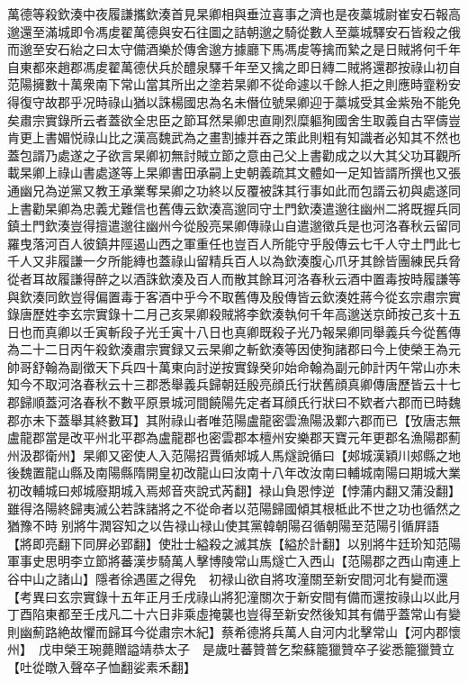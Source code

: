 萬德等殺欽湊中夜履謙攜欽湊首見杲卿相與垂泣喜事之濟也是夜藁城尉崔安石報高邈還至滿城即令馮䖍翟萬德與安石往圖之詰朝邈之騎從數人至藁城驛安石皆殺之俄而邈至安石紿之曰太守備酒樂於傳舍邈方據廳下馬馮䖍等擒而縶之是日賊將何千年自東都來趙郡馮䖍翟萬德伏兵於醴泉驛千年至又擒之即日縳二賊將還郡按祿山初自范陽擁數十萬衆南下常山當其所出之塗若杲卿不從命遽以千餘人拒之則應時韲粉安得復守故郡乎况時祿山猶以誅楊國忠為名未僭位號杲卿迎于藁城受其金紫殆不能免矣肅宗實錄所云者蓋欲全忠臣之節耳然杲卿忠直剛烈糜軀狥國舍生取義自古罕儔豈肯更上書媚悦祿山比之漢高魏武為之畫割據并吞之策此則粗有知識者必知其不然也蓋包諝乃處遂之子欲言杲卿初無討賊立節之意由己父上書勸成之以大其父功耳觀所載杲卿上祿山書處遂等上杲卿書田承嗣上史朝義疏其文體如一足知皆諝所撰也又張通幽兄為逆黨又教王承業奪杲卿之功終以反覆被誅其行事如此而包諝云初與處遂同上書勸杲卿為忠義尤難信也舊傳云欽湊高邈同守土門欽湊遣邈往幽州二將既握兵同鎮土門欽湊豈得擅遣邈往幽州今從殷亮杲卿傳祿山自遣邈徵兵是也河洛春秋云留同羅曳落河百人彼鎮井陘遏山西之軍重任也豈百人所能守乎殷傳云七千人守土門此七千人又非履謙一夕所能縳也蓋祿山留精兵百人以為欽湊腹心爪牙其餘皆團練民兵脅從者耳故履謙得醉之以酒誅欽湊及百人而散其餘耳河洛春秋云酒中置毒按時履謙等與欽湊同飲豈得偏置毒于客酒中乎今不取舊傳及殷傳皆云欽湊姓蔣今從玄宗肅宗實錄唐歷姓李玄宗實錄十二月己亥杲卿殺賊將李欽湊執何千年高邈送京師按己亥十五日也而真卿以壬寅斬段子光壬寅十八日也真卿既殺子光乃報杲卿同舉義兵今從舊傳為二十二日丙午殺欽湊肅宗實録又云杲卿之斬欽湊等因使狥諸郡曰今上使榮王為元帥哥舒翰為副徵天下兵四十萬東向討逆按實錄癸卯始命翰為副元帥計丙午常山亦未知今不取河洛春秋云十三郡悉舉義兵歸朝廷殷亮顔氏行狀舊顔真卿傳唐歷皆云十七郡歸順蓋河洛春秋不數平原景城河間饒陽先定者耳顔氏行狀曰不欵者六郡而已時魏郡亦未下蓋舉其終數耳】其附祿山者唯范陽盧龍密雲漁陽汲鄴六郡而已【攷唐志無盧龍郡當是改平州北平郡為盧龍郡也密雲郡本檀州安樂郡天寶元年更郡名漁陽郡薊州汲郡衛州】杲卿又密使人入范陽招賈循郟城人馬燧說循曰【郟城漢穎川郟縣之地後魏置龍山縣及南陽縣隋開皇初改龍山曰汝南十八年改汝南曰輔城南陽曰期城大業初改輔城曰郟城廢期城入焉郟音夾說式芮翻】禄山負恩悖逆【悖蒲内翻又蒲没翻】雖得洛陽終歸夷滅公若誅諸將之不從命者以范陽歸國傾其根柢此不世之功也循然之猶豫不時别將牛潤容知之以告禄山禄山使其黨韓朝陽召循朝陽至范陽引循屛語【將即亮翻下同屏必郢翻】使壯士縊殺之滅其族【縊於計翻】以别將牛廷玠知范陽軍事史思明李立節將蕃漢步騎萬人擊博陵常山馬燧亡入西山【范陽郡之西山南連上谷中山之諸山】隱者徐遇匿之得免　初禄山欲自將攻潼關至新安間河北有變而還　【考異曰玄宗實錄十五年正月壬戌祿山將犯潼關次于新安間有備而還按祿山以此月丁酉陷東都至壬戌凡二十六日非乘虛掩襲也豈得至新安然後知其有備乎蓋常山有變則幽薊路絶故懼而歸耳今從肅宗木紀】蔡希德將兵萬人自河内北擊常山【河内郡懷州】　戊申榮王琬薨贈謚靖恭太子　是歲吐蕃贊普乞棃蘇籠獵贊卒子娑悉籠獵贊立【吐從暾入聲卒子恤翻娑素禾翻】

